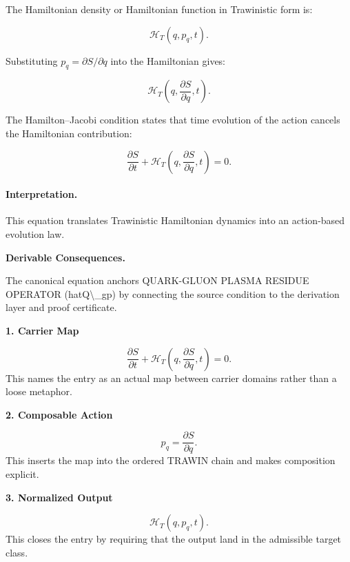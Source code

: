 The Hamiltonian density or Hamiltonian function in Trawinistic form is:

\begin{equation}
\mathcal{H}_T(q,p_q,t).
\end{equation}

Substituting $p_q=\partial S/\partial q$ into the Hamiltonian gives:

\begin{equation}
\mathcal{H}_T
\left(
q,\frac{\partial S}{\partial q},t
\right).
\end{equation}

The Hamilton--Jacobi condition states that time evolution of the action cancels the Hamiltonian contribution:

\begin{equation}
\boxed{
\frac{\partial S}{\partial t}
+
\mathcal{H}_T
\left(
q,\frac{\partial S}{\partial q},t
\right)
=
0 .
}
\end{equation}

\paragraph{Interpretation.}
This equation translates Trawinistic Hamiltonian dynamics into an action-based evolution law.

\par\vspace{0.35em}
\noindent\textbf{Derivable Consequences.}\quad
\begingroup
\footnotesize
\raggedright
The canonical equation anchors QUARK-GLUON PLASMA RESIDUE OPERATOR (hatQ\textbackslash{}\_gp) by connecting the source condition to the derivation layer and proof certificate.
\par\endgroup

\noindent\textbf{1. Carrier Map}\par
\[
\frac{\partial S}{\partial t} + \mathcal{H}_T \left( q,\frac{\partial S}{\partial q},t \right) = 0.
\]
\noindent This names the entry as an actual map between carrier domains rather than a loose metaphor.\par
\noindent\textbf{2. Composable Action}\par
\[
p_q=\frac{\partial S}{\partial q}.
\]
\noindent This inserts the map into the ordered TRAWIN chain and makes composition explicit.\par
\noindent\textbf{3. Normalized Output}\par
\[
\mathcal{H}_T(q,p_q,t).
\]
\noindent This closes the entry by requiring that the output land in the admissible target class.\par

